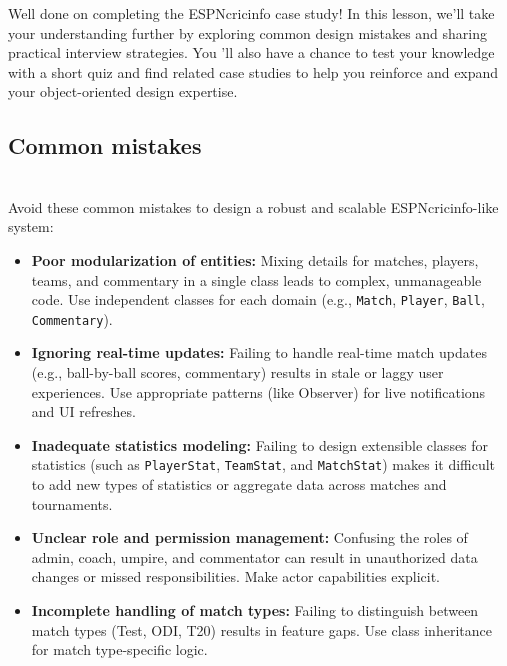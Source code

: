 

Well done on completing the ESPNcricinfo case study! In this lesson, we'll take your understanding further by exploring common design mistakes and sharing practical interview strategies. You 'll also have a chance to test your knowledge with a short quiz and find related case studies to help you reinforce and expand your object-oriented design expertise.

\subsection{Common mistakes}\label{39NL0Z58Iy8fB2WVV4jyY}
\\
Avoid these common mistakes to design a robust and scalable ESPNcricinfo-like system:

\begin{itemize}
\item
\protect{}\label{NHnjeg-FG3wxMtHdYoEMf}
\textbf{Poor modularization of entities:} Mixing details for matches, players, teams, and commentary in a single class leads to complex, unmanageable code. Use independent classes for each domain (e.g., \texttt{Match}, \texttt{Player}, \texttt{Ball}, \texttt{Commentary}).
\item
\protect{}\label{TKP4glJ566Tj_cdSd8zo-}
\textbf{Ignoring real-time updates:} Failing to handle real-time match updates (e.g., ball-by-ball scores, commentary) results in stale or laggy user experiences. Use appropriate patterns (like Observer) for live notifications and UI refreshes.
\item
\protect{}\label{YjET_8saz3KN9uTdv5GsI}
\textbf{Inadequate statistics modeling:} Failing to design extensible classes for statistics (such as \texttt{PlayerStat}, \texttt{TeamStat}, and \texttt{MatchStat}) makes it difficult to add new types of statistics or aggregate data across matches and tournaments.
\item
\protect{}\label{biympz76Vf1sB6vwa18Vg}
\textbf{Unclear role and permission management:} Confusing the roles of admin, coach, umpire, and commentator can result in unauthorized data changes or missed responsibilities. Make actor capabilities explicit.
\item
\protect{}\label{kZxdi4nTF0pN_hvN4ovUF}
\textbf{Incomplete handling of match types:} Failing to distinguish between match types (Test, ODI, T20) results in feature gaps. Use class inheritance for match type-specific logic.
\end{itemize}

